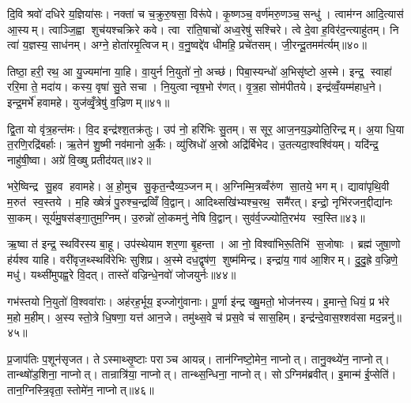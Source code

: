 दि॒वि श्रवो॑ दधिरे य॒ज्ञिया॑सः। नक्ता॑ च च॒क्रुरु॒षसा॒ विरू॑पे। कृ॒ष्णञ्च॒ वर्ण॑मरु॒णञ्च॒ सन्धु॑। त्वाम॑ग्न आदि॒त्यास॑ आ॒स्यम्। त्वाञ्जि॒ह्वा शुच॑यश्चक्रिरे कवे। त्वा रा॑ति॒षाचो॑ अध्व॒रेषु॑ सश्चिरे। त्वे दे॒वा ह॒विर॑द॒न्त्याहु॑तम्। नि त्वा॑ य॒ज्ञस्य॒ साध॑नम्। अग्ने॒ होता॑रमृ॒त्विजम्। व॒नु॒ष्वद्दे॑व धीमहि॒ प्रचे॑तसम्। जी॒रन्दू॒तमम॑र्त्यम्॥४०॥\anuvakamend[य॒ज्ञ॒वा॒ह॒सा॒स॒प॒र्य॒न्व॒यमृ॑द्ध्यां॒ भिख्ष॑माणा॒ प्रचे॑तस॒मेक॑ञ्च]

तिष्ठा॒ हरी॒ रथ॒ आ यु॒ज्यमा॑ना या॒हि। वा॒युर्न नि॒युतो॑ नो॒ अच्छ॑। पिबा॒स्यन्धो॑ अ॒भिसृ॑ष्टो अ॒स्मे। इन्द्र॒ स्वाहा॑ ररि॒मा ते॒ मदा॑य। कस्य॒ वृषा॑ सु॒ते सचा। नि॒युत्वान्वृष॒भो र॑णत्। वृ॒त्र॒हा सोम॑पीतये। इन्द्र॑व्वँ॒यम्म॑हाध॒ने। इन्द्र॒मर्भे॑ हवामहे। युज॑व्वृँ॒त्रेषु॑ व॒ज्रिणम्॥४१॥

द्वि॒ता यो वृ॑त्र॒हन्त॑मः। वि॒द इन्द्र॑श्श॒तक्र॑तुः। उप॑ नो॒ हरि॑भिः सु॒तम्। स सूर॒ आज॒नय॒ञ्ज्योति॒रिन्द्रम्। अ॒या धि॒या त॒रणि॒रद्रि॑बर्\mbox{}हाः। ऋ॒तेन॑ शु॒ष्मी नव॑मानो अ॒र्कैः। व्यु॑स्रिधो॑ अ॒स्रो अद्रि॑र्बिभेद। उ॒तत्यदा॒श्वश्वि॑यम्। यदि॑न्द्र॒ नाहु॑षी॒ष्वा। अग्रे॑ वि॒ख्षु प्रतीद॑यत्॥४२॥

भरे॒ष्विन्द्र सु॒हव हवामहे। अ॒हो॒मुच सु॒कृत॒न्दैव्य॒ञ्जनम्। अ॒ग्निम्मि॒त्रव्वँरु॑ण सा॒तये॒ भगम्। द्यावा॑पृथि॒वी म॒रुत॑ स्व॒स्तये। म॒हि ख्षेत्रं॑ पु॒रुश्च॒न्द्रव्विँ वि॒द्वान्। आदिथ्सखि॑भ्यश्च॒रथ॒ समै॑रत्। इन्द्रो॒ नृभि॑रजन॒द्दीद्या॑नः सा॒कम्। सूर्य॑मु॒षस॑ङ्गा॒तुम॒ग्निम्। उ॒रुन्नो॑ लो॒कमनु॑ नेषि वि॒द्वान्। सुव॑र्व॒ज्ज्योति॒रभ॑य स्व॒स्ति॥४३॥

ऋ॒ष्वा त॑ इन्द्र॒ स्थवि॑रस्य बा॒हू। उप॑स्थेयाम शर॒णा बृ॒हन्ता। आ नो॒ विश्वा॑भिरू॒तिभि॑ स॒जोषाः। ब्रह्म॑ जुषा॒णो ह॑र्यश्व याहि। वरी॑वृज॒थ्स्थवि॑रेभिः सुशिप्र। अ॒स्मे दध॒द्वृष॑ण॒ शुष्म॑मिन्द्र। इन्द्रा॑य॒ गाव॑ आ॒शिरम्। दु॒दु॒ह्रे व॒ज्रिणे॒ मधु॑। यथ्सी॑मुपह्व॒रे वि॒दत्। तास्ते॑ वज्रिन्धे॒नवो॑ जोजयुर्नः॥४४॥

गभ॑स्तयो नि॒युतो॑ वि॒श्ववा॑राः। अह॑रह॒र्भूय॒ इज्जोगु॑वानाः। पू॒र्णा इ॑न्द्र ख्षु॒मतो॒ भोज॑नस्य। इ॒मान्ते॒ धियं॒ प्र भ॑रे म॒हो म॒हीम्। अ॒स्य स्तो॒त्रे धि॒षणा॒ यत्त॑ आन॒जे। तमु॑थ्स॒वे च॑ प्रस॒वे च॑ सास॒हिम्। इन्द्र॑न्दे॒वास॒श्शव॑सा मद॒न्ननु॑॥४५॥\anuvakamend[व॒ज्रिण॑मयथ्स्व॒स्ति जो॑जयुर्नः स॒प्त च॑]

प्र॒जाप॑तिः प॒शून॑सृजत। तेऽस्माथ्सृ॒ष्टाः पराञ्च आयन्न्। तान॑ग्निष्टो॒मेन॒ नाप्नोत्। तानु॒क्थ्ये॑न॒ नाप्नोत्। तान्थ्षो॑ड॒शिना॒ नाप्नोत्। तान्रात्रि॑या॒ नाप्नोत्। तान्थ्स॒न्धिना॒ नाप्नोत्। सोऽग्निम॑ब्रवीत्। इ॒मान्म॑ ई॒प्सेति॑। तान॒ग्निस्त्रि॒वृता॒ स्तोमे॑न॒ नाप्नोत्॥४६॥

